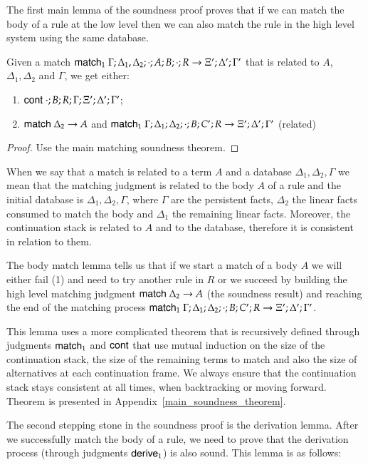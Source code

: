 The first main lemma of the soundness proof proves that if we can match the body
of a rule at the low level then we can also match the rule in the high level system using the same database.

\begin{lemma}
Given a match $\mathsf{match}_1 \; \Gamma; \Delta_1, \Delta_2; \cdot; A; B; \cdot; R \rightarrow \Xi'; \Delta'; \Gamma'$ that is related to $A$, $\Delta_1, \Delta_2$ and $\Gamma$, we get either:

\begin{enumerate}
   \item $\mathsf{cont} \; \cdot; B; R; \Gamma; \Xi'; \Delta'; \Gamma'$;
   \item $\mathsf{match} \; \Delta_2 \rightarrow A$ and $\mathsf{match}_1 \; \Gamma; \Delta_1; \Delta_2; \cdot; B; C'; R \rightarrow \Xi'; \Delta'; \Gamma'$ (related)
\end{enumerate}
\end{lemma}
\begin{proof}Use the main matching soundness theorem.
\end{proof}

When we say that a match is related to a term $A$ and a database $\Delta_1, \Delta_2, \Gamma$ we mean that
the matching judgment is related to the body $A$ of a rule and the initial database is $\Delta_1, \Delta_2, \Gamma$, where $\Gamma$ are
the persistent facts, $\Delta_2$ the linear facts consumed to match the body and $\Delta_1$ the remaining linear facts.
Moreover, the continuation stack is related to $A$ and to the database, therefore it is consistent in relation to them.

The body match lemma tells us that if we start a match of a body $A$ we will either fail (1) and need to try another rule in $R$ or we succeed by building the high level matching judgment $\mathsf{match} \; \Delta_2 \rightarrow A$ (the soundness result) and reaching the end of the matching process $\mathsf{match}_1 \; \Gamma; \Delta_1; \Delta_2; \cdot; B; C'; R \rightarrow \Xi'; \Delta'; \Gamma'$.

This lemma uses a more complicated theorem that is recursively defined through judgments $\mathsf{match}_1$ and $\mathsf{cont}$ that use mutual induction on the
size of the continuation stack, the size of the remaining terms to match and also the size of alternatives at each continuation frame. We always ensure that the
continuation stack stays consistent at all times, when backtracking or moving forward. Theorem is presented in Appendix~\ref{main_soundness_theorem}.
 
The second stepping stone in the soundness proof is the derivation lemma. After we successfully match the
body of a rule, we need to prove that the derivation process (through judgments $\mathsf{derive}_1$) is also
sound. This lemma is as follows:

